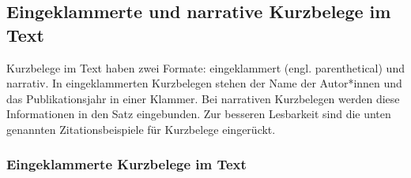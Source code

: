 \documentclass[
  letterpaper,
  DIV=11]{scrreprt}
\begin{document}
\subsection{Eingeklammerte und narrative Kurzbelege im
Text}\label{eingeklammerte-und-narrative-kurzbelege-im-text}

Kurzbelege im Text haben zwei Formate: eingeklammert (engl.
parenthetical) und narrativ. In eingeklammerten Kurzbelegen stehen der
Name der Autor*innen und das Publikationsjahr in einer Klammer. Bei
narrativen Kurzbelegen werden diese Informationen in den Satz
eingebunden. Zur besseren Lesbarkeit sind die unten genannten
Zitationsbeispiele für Kurzbelege eingerückt.

\subsubsection{Eingeklammerte Kurzbelege im
Text}\label{eingeklammerte-kurzbelege-im-text}
\end{document}
